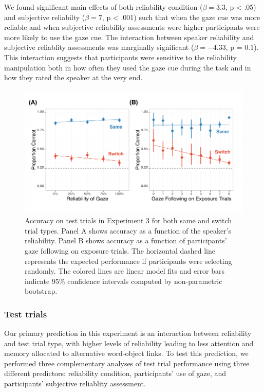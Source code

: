 \documentclass[a4paper,man,floatsintext]{apa6}
\newenvironment{CodeChunk}{}{}
\begin{document}
\noindent We found significant main effects of both reliability
condition (\(\beta = 3.3\), p \textless{} .05) and subjective reliabilty
(\(\beta = 7\), p \textless{} .001) such that when the gaze cue was more
reliable and when subjective reliability assessments were higher
participants were more likely to use the gaze cue. The interaction
between speaker reliability and subjective reliablity assessments was
marginally significant (\(\beta = -4.33\), p = 0.1). This interaction
suggests that participants were sensitive to the reliability
manipulation both in how often they used the gaze cue during the task
and in how they rated the speaker at the very end.

\begin{CodeChunk}
\begin{figure}[!ht]
\includegraphics{figs/expt3-plot-1} \caption[Accuracy on test trials in Experiment 3 for both same and switch trial types]{Accuracy on test trials in Experiment 3 for both same and switch trial types. Panel A shows accuracy as a function of the speaker's reliability. Panel B shows accuracy as a function of participants' gaze following on exposure trials. The horizontal dashed line represents the expected performance if participants were selecting randomly. The colored lines are linear model fits and error bars indicate 95\% confidence intervals computed by non-parametric bootstrap.}\label{fig:expt3-plot}
\end{figure}
\end{CodeChunk}

\subsubsection{Test trials}\label{test-trials-2}

Our primary prediction in this experiment is an interaction between
reliability and test trial type, with higher levels of reliability
leading to less attention and memory allocated to alternative
word-object links. To test this prediction, we performed three
complementary analyses of test trial performance using three different
predictors: reliability condition, participants' use of gaze, and
participants' subjective reliablity assessment.
\end{document}
